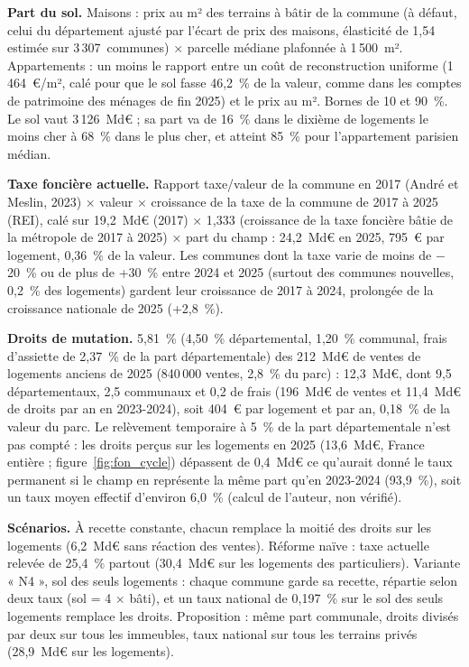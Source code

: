 \textbf{Part du sol.} Maisons : prix au m² des terrains à bâtir de la commune (à défaut, celui du département ajusté par
l'écart de prix des maisons, élasticité de 1,54 estimée sur 3\,307~communes) × parcelle médiane plafonnée à 1\,500~m².
Appartements : un moins le rapport entre un coût de reconstruction uniforme (1\,464~€/m², calé pour que le sol fasse
46,2~\% de la valeur, comme dans les comptes de patrimoine des ménages de fin 2025) et le prix au m². Bornes de 10 et
90~\%. Le sol vaut 3\,126~Md€ ; sa part va de 16~\% dans le dixième de logements le moins cher à 68~\% dans le plus cher,
et atteint 85~\% pour l'appartement parisien médian.

\textbf{Taxe foncière actuelle.} Rapport taxe/valeur de la commune en 2017 (André et Meslin, 2023) × valeur × croissance
de la taxe de la commune de 2017 à 2025 (REI), calé sur 19,2~Md€ (2017) × 1,333 (croissance de la taxe foncière bâtie de
la métropole de 2017 à 2025) × part du champ : 24,2~Md€ en 2025, 795~€ par logement, 0,36~\% de la valeur. Les communes
dont la taxe varie de moins de $-$20~\% ou de plus de +30~\% entre 2024 et 2025 (surtout des communes nouvelles,
0,2~\% des logements) gardent leur croissance de 2017 à 2024, prolongée de la croissance nationale de 2025 (+2,8~\%).

\textbf{Droits de mutation.} 5,81~\% (4,50~\% départemental, 1,20~\% communal, frais d'assiette de 2,37~\% de la part
départementale) des 212~Md€ de ventes de logements anciens de 2025 (840\,000 ventes, 2,8~\% du parc) : 12,3~Md€, dont 9,5
départementaux, 2,5 communaux et 0,2 de frais (196~Md€ de ventes et 11,4~Md€ de droits par an en 2023-2024), soit 404~€
par logement et par an, 0,18~\% de la valeur du parc. Le relèvement temporaire à 5~\% de la part départementale n'est pas
compté : les droits perçus sur les logements en 2025 (13,6~Md€, France entière ; figure~\ref{fig:fon_cycle}) dépassent
de 0,4~Md€ ce qu'aurait donné le taux permanent si le champ en représente la même part qu'en 2023-2024 (93,9~\%), soit un
taux moyen effectif d'environ 6,0~\% (calcul de l'auteur, non vérifié).

\textbf{Scénarios.} À recette constante, chacun remplace la moitié des droits sur les logements (6,2~Md€ sans réaction
des ventes). Réforme naïve : taxe actuelle relevée de 25,4~\% partout (30,4~Md€ sur les logements des particuliers).
Variante « N4 », sol des seuls logements : chaque commune garde sa recette, répartie selon deux taux (sol = 4 × bâti), et un taux
national de 0,197~\% sur le sol des seuls logements remplace les droits. Proposition : même part communale, droits
divisés par deux sur tous les immeubles, taux national sur tous les terrains privés (28,9~Md€ sur les logements).

